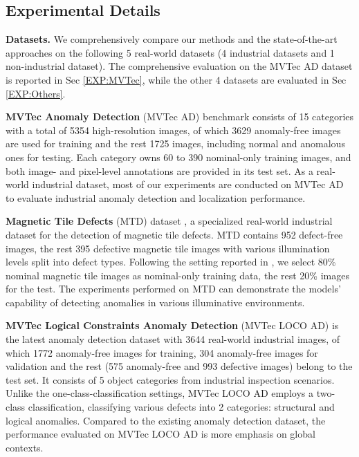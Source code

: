 \documentclass[default,iicol]{sn-jnl}\usepackage[algo2e,ruled,linesnumbered]{algorithm2e}
\theoremstyle{thmstyleone}\newtheorem{theorem}{Theorem}\newtheorem{proposition}[theorem]{Proposition}
\theoremstyle{thmstyletwo}\newtheorem{example}{Example}\newtheorem{remark}{Remark}
\theoremstyle{thmstylethree}\newtheorem{definition}{Definition}
\begin{document}
\subsection{Experimental Details}

\noindent\textbf{Datasets. }\label{sec:dataset}
We comprehensively compare our methods and the state-of-the-art approaches on the following 5 real-world datasets (4 industrial datasets and 1 non-industrial dataset).
The comprehensive evaluation on the MVTec AD dataset is reported in Sec \ref{EXP:MVTec}, while the other 4 datasets are evaluated in Sec \ref{EXP:Others}.

\textbf{MVTec Anomaly Detection} (MVTec AD) benchmark \cite{MVTEC} consists of 15 categories with a total of 5354 high-resolution images, of which 3629 anomaly-free images are used for training and the rest 1725 images, including normal and anomalous ones for testing.
Each category owns 60 to 390 nominal-only training images, and both image- and pixel-level annotations are provided in its test set.
As a real-world industrial dataset, most of our experiments are conducted on MVTec AD to evaluate industrial anomaly detection and localization performance.

\textbf{Magnetic Tile Defects} (MTD) dataset \cite{MTD}, a specialized real-world industrial dataset for the detection of magnetic tile defects.
MTD contains 952 defect-free images, the rest 395 defective magnetic tile images with various illumination levels split into  defect types.
Following the setting reported in \cite{DifferNet}, we select 80\% nominal magnetic tile images as nominal-only training data, the rest 20\% images for the test.
The experiments performed on MTD can demonstrate the models' capability of detecting anomalies in various illuminative environments.

\textbf{MVTec Logical Constraints Anomaly Detection} (MVTec LOCO AD) \cite{MVTECLOCO} is the latest anomaly detection dataset with 3644 real-world industrial images, of which 1772 anomaly-free images for training, 304 anomaly-free images for validation and the rest (575 anomaly-free and 993 defective images) belong to the test set.
It consists of 5 object categories from industrial inspection scenarios.
Unlike the one-class-classification settings, MVTec LOCO AD employs a two-class classification, classifying various defects into 2 categories: structural and logical anomalies.
Compared to the existing anomaly detection dataset, the performance evaluated on MVTec LOCO AD is more emphasis on global contexts.
\end{document}
